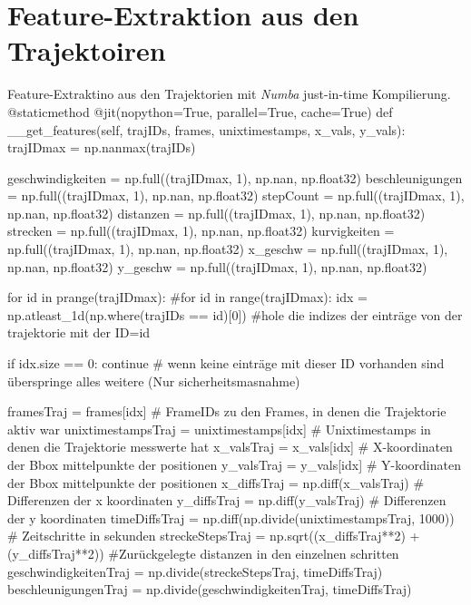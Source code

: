 \clearpage
\section*{Feature-Extraktion aus den Trajektoiren}

\begin{pythoncodeAnhang}{Feature-Extraktino aus den Trajektorien mit \textit{Numba} just-in-time Kompilierung.}
@staticmethod
@jit(nopython=True, parallel=True, cache=True)
def __get_features(self, trajIDs, frames, unixtimestamps, x_vals, y_vals):
    trajIDmax = np.nanmax(trajIDs)

    geschwindigkeiten = np.full((trajIDmax, 1), np.nan, np.float32)
    beschleunigungen = np.full((trajIDmax, 1), np.nan, np.float32)
    stepCount = np.full((trajIDmax, 1), np.nan, np.float32)
    distanzen = np.full((trajIDmax, 1), np.nan, np.float32)
    strecken = np.full((trajIDmax, 1), np.nan, np.float32)
    kurvigkeiten = np.full((trajIDmax, 1), np.nan, np.float32)
    x_geschw = np.full((trajIDmax, 1), np.nan, np.float32)
    y_geschw = np.full((trajIDmax, 1), np.nan, np.float32)

    for id in prange(trajIDmax):
    #for id in range(trajIDmax):
        idx = np.atleast_1d(np.where(trajIDs == id)[0]) #hole die indizes der einträge von der trajektorie mit der ID=id
        
        if idx.size == 0: continue # wenn keine einträge mit dieser ID vorhanden sind überspringe alles weitere (Nur sicherheitsmasnahme)
        
        framesTraj = frames[idx]                        # FrameIDs zu den Frames, in denen die Trajektorie aktiv war
        unixtimestampsTraj = unixtimestamps[idx]        # Unixtimestamps in denen die Trajektorie messwerte hat
        x_valsTraj = x_vals[idx]                        # X-koordinaten der Bbox mittelpunkte der positionen
        y_valsTraj = y_vals[idx]                        # Y-koordinaten der Bbox mittelpunkte der positionen
        x_diffsTraj = np.diff(x_valsTraj)               # Differenzen der x koordinaten
        y_diffsTraj = np.diff(y_valsTraj)               # Differenzen der y koordinaten 
        timeDiffsTraj = np.diff(np.divide(unixtimestampsTraj, 1000))        # Zeitschritte in sekunden
        streckeStepsTraj = np.sqrt((x_diffsTraj**2) + (y_diffsTraj**2))     #Zurückgelegte distanzen in den einzelnen schritten
        geschwindigkeitenTraj = np.divide(streckeStepsTraj, timeDiffsTraj)
        beschleunigungenTraj = np.divide(geschwindigkeitenTraj, timeDiffsTraj)
        

\end{pythoncodeAnhang}
